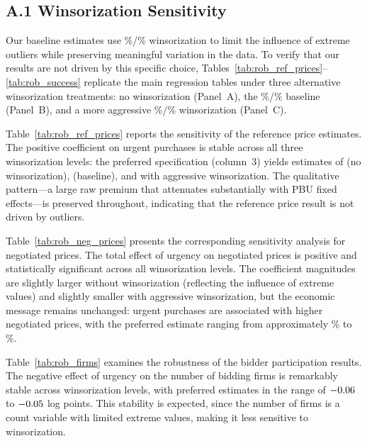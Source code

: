 \subsection*{A.1 Winsorization Sensitivity}

Our baseline estimates use \BPwinsorLow\%/\BPwinsorHigh\% winsorization to limit the influence of extreme outliers while preserving meaningful variation in the data. To verify that our results are not driven by this specific choice, Tables~\ref{tab:rob_ref_prices}--\ref{tab:rob_success} replicate the main regression tables under three alternative winsorization treatments: no winsorization (Panel~A), the \BPwinsorLow\%/\BPwinsorHigh\% baseline (Panel~B), and a more aggressive \BPwinsorAggLow\%/\BPwinsorAggHigh\% winsorization (Panel~C).

Table~\ref{tab:rob_ref_prices} reports the sensitivity of the reference price estimates. The positive coefficient on urgent purchases is stable across all three winsorization levels: the preferred specification (column~3) yields estimates of \BProbRefNoWin{} (no winsorization), \BProbRefBase{} (baseline), and \BProbRefAgg{} with aggressive winsorization. The qualitative pattern---a large raw premium that attenuates substantially with PBU fixed effects---is preserved throughout, indicating that the reference price result is not driven by outliers.


Table~\ref{tab:rob_neg_prices} presents the corresponding sensitivity analysis for negotiated prices. The total effect of urgency on negotiated prices is positive and statistically significant across all winsorization levels. The coefficient magnitudes are slightly larger without winsorization (reflecting the influence of extreme values) and slightly smaller with aggressive winsorization, but the economic message remains unchanged: urgent purchases are associated with higher negotiated prices, with the preferred estimate ranging from approximately \BProbNegLow\% to \BProbNegHigh\%.


Table~\ref{tab:rob_firms} examines the robustness of the bidder participation results. The negative effect of urgency on the number of bidding firms is remarkably stable across winsorization levels, with preferred estimates in the range of $-0.06$ to $-0.05$ log points. This stability is expected, since the number of firms is a count variable with limited extreme values, making it less sensitive to winsorization.

